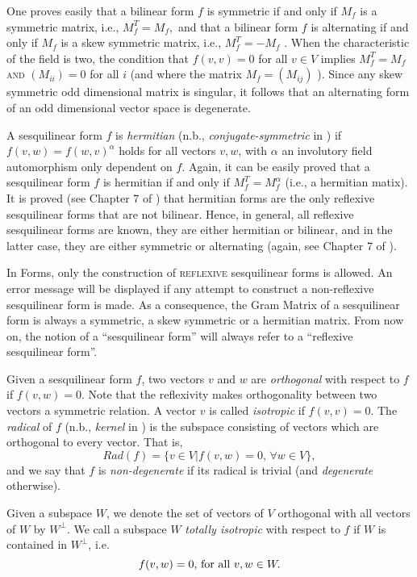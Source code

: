 \documentclass[a4paper,11pt]{report}
\begin{document}
{{ One proves easily that a bilinear form $f$ is symmetric if and only if $M_f$  is a symmetric matrix, i.e., $M_f^T=M_f,$  and that a bilinear form $f$ is alternating if and only if  $M_f$ is a skew symmetric matrix, i.e., $M_f^T=-M_f$ . When the characteristic of the field is two, the condition that $f(v,v)=0$ for all $v \in V$ implies $M_f^T=M_f$  \textsc{and} $(M_{ii})=0$  for all $i$ (and where the matrix  $M_f = (M_{ij})$ ). Since any skew symmetric odd dimensional matrix is singular, it follows
that an alternating form of an odd dimensional vector space is degenerate. 

 A sesquilinear form $f$ is \emph{hermitian} (n.b., \emph{conjugate-symmetric} in \cite{Atlas}) if $f(v,w)=f(w,v)^\alpha$  holds for all vectors $v,w$, with $\alpha$ an involutory field automorphism only dependent on $f$. Again, it can be easily proved that a sesquilinear form $f$ is hermitian if and only if  $M_f^T = M_f^{\alpha}$  (i.e., a hermitian matix). It is proved (see Chapter 7 of \cite{Taylor}) that hermitian forms are the only reflexive sesquilinear forms that are not
bilinear. Hence, in general, all reflexive sesquilinear forms are known, they
are either hermitian or bilinear, and in the latter case, they are either
symmetric or alternating (again, see Chapter 7 of \cite{Taylor}). 

 In \textsf{Forms}, only the construction of \textsc{reflexive} sesquilinear forms is allowed. An error message will be displayed if any
attempt to construct a non-reflexive sesquilinear form is made. As a
consequence, the Gram Matrix of a sesquilinear form is always a symmetric, a
skew symmetric or a hermitian matrix. From now on, the notion of a
``sesquilinear form'' will always refer to a ``reflexive sesquilinear form''. 

 Given a sesquilinear form $f$, two vectors $v$ and $w$ are \emph{orthogonal} with respect to $f$ if $f(v,w) = 0$. Note that the reflexivity makes orthogonality between two vectors a
symmetric relation. A vector $v$ is called \emph{isotropic} if $f(v,v)=0$. The \emph{radical} of $f$ (n.b., \emph{kernel} in \cite{Atlas}) is the subspace consisting of vectors which are orthogonal to every vector.
That is,  
\[Rad(f) = \{v \in V | f(v,w) = 0,\, \forall w \in V\},\]
   and we say that $f$ is \emph{non-degenerate} if its radical is trivial (and \emph{degenerate} otherwise). 

Given a subspace $W$, we denote the set of vectors of $V$ orthogonal with all vectors of $W$ by $W^\perp$. We call a subspace $W$ \emph{totally isotropic} with respect to $f$ if $W$ is contained in $W^\perp$, i.e. 
\[f(v,w) = 0,\, \mbox{\rm for all } v,w \in W.\]
 

}}
\end{document}
